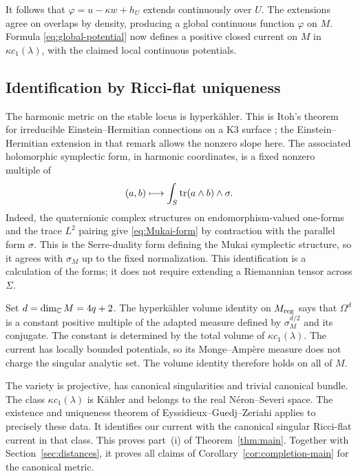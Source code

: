 It follows that $\varphi=u-\kappa w+h_U$ extends
continuously over $U$. The extensions agree on overlaps
by density, producing a global continuous function
$\varphi$ on $M$. Formula \eqref{eq:global-potential}
now defines a positive closed current on $M$ in
$\kappa c_1(\lambda)$, with the claimed local
continuous potentials.

\subsection{Identification by Ricci-flat uniqueness}
The harmonic metric on the stable locus is
hyperk\"ahler. This is Itoh's theorem for irreducible
Einstein--Hermitian connections on a K3 surface
\cite[Theorem~2.1 and Remark~(iii)]{itoh88}; the
Einstein--Hermitian extension in that remark allows
the nonzero slope here. The associated holomorphic
symplectic form, in harmonic coordinates, is a fixed
nonzero multiple of
\begin{equation}\label{eq:Mukai-form}
 (a,b)\longmapsto\int_S\operatorname{tr}(a\wedge b)\wedge\sigma.
\end{equation}
Indeed, the quaternionic complex structures on
endomorphism-valued one-forms and the trace $L^2$
pairing give \eqref{eq:Mukai-form} by contraction
with the parallel form $\sigma$. This is the
Serre-duality form defining the Mukai symplectic
structure, so it agrees with $\sigma_M$ up to the
fixed normalization. This identification is a
calculation of the forms; it does not require
extending a Riemannian tensor across $\Sigma$.

Set $d=\dim_{\mathbb C}M=4q+2$. The hyperk\"ahler volume
identity on $M_{\mathrm{reg}}$ says that $\Omega^d$ is a
constant positive multiple of the adapted measure
defined by $\sigma_M^{d/2}$ and its conjugate. The
constant is determined by the total volume of
$\kappa c_1(\lambda)$. The current has locally
bounded potentials, so its Monge--Amp\`ere measure
does not charge the singular analytic set. The
volume identity therefore holds on all of $M$.

The variety is projective, has canonical
singularities and trivial canonical bundle. The
class $\kappa c_1(\lambda)$ is K\"ahler and belongs
to the real N\'eron--Severi space. The existence and
uniqueness theorem of Eyssidieux--Guedj--Zeriahi
\cite[Theorem~7.5 and Corollary~7.6]{egz09} applies
to precisely these data. It identifies our current
with the canonical singular Ricci-flat current in
that class. This proves part~(i) of
Theorem~\ref{thm:main}. Together with
Section~\ref{sec:distances}, it proves all claims
of Corollary~\ref{cor:completion-main} for the
canonical metric.
